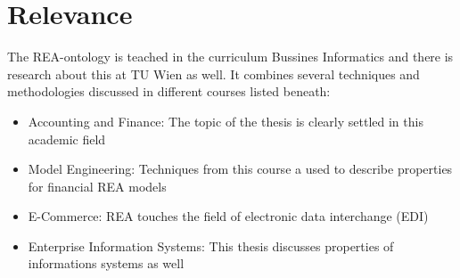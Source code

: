 \section*{Relevance}

The REA-ontology is teached in the curriculum Bussines Informatics and there is research about this at TU Wien as well.
It combines several techniques and methodologies discussed in different courses listed beneath:

\begin{itemize}
	\item Accounting and Finance: The topic of the thesis is clearly settled in this academic field
	\item Model Engineering: Techniques from this course a used to describe properties for financial REA models
	\item E-Commerce: REA touches the field of electronic data interchange (EDI) 
	\item Enterprise Information Systems: This thesis discusses properties of informations systems as well
\end{itemize}





